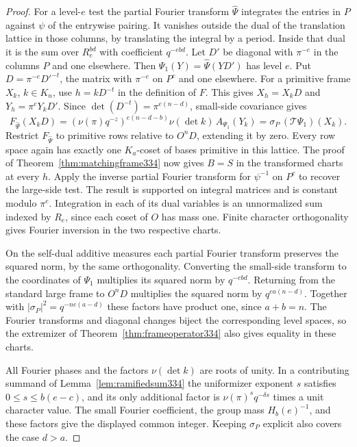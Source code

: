 \documentclass[a4paper,11pt]{article}
\theoremstyle{definition}
\theoremstyle{remark}
\numberwithin{equation}{section}
\begin{document}
\begin{proof}
For a level-\(e\) test the partial Fourier transform \(\widehat\Psi\)
integrates the entries in \(P\) against \(\psi\) of the entrywise
pairing. It vanishes outside the dual of the translation lattice in
those columns, by translating the integral by a period. Inside that
dual it is the sum over \(R_e^{bd}\) with coefficient \(q^{-ebd}\).
Let \(D'\) be diagonal with \(\pi^{-e}\) in the columns \(P\) and one
elsewhere. Then \(\Psi_1(Y)=\widehat\Psi(YD')\) has level \(e\).
Put \(D=\pi^{-e}D'^{-t}\), the matrix with \(\pi^{-e}\) on \(P^c\)
and one elsewhere. For a primitive frame \(X_k\), \(k\in K_n\), use
\(h=kD^{-t}\) in the definition of \(F\). This gives \(X_h=X_k D\)
and \(Y_h=\pi^e Y_kD'\). Since
\(\det(D^{-t})=\pi^{e(n-d)}\), small-side covariance gives
\[
 F_{\widehat\Psi}(X_k D)
   =(\nu(\pi)q^{-z})^{e(n-d-b)}
       \nu(\det k)\,A_{\Psi_1}(Y_k)
   =\sigma_P\,(\mathcal T\Psi_1)(X_k).
\]
Restrict \(F_{\widehat\Psi}\) to primitive rows relative to \(O^nD\),
extending it by zero. Every row space again has exactly one \(K_a\)-coset
of bases primitive in this lattice. The proof of
Theorem~\ref{thm:matchingframe334} now gives \(B=S\) in the transformed
charts at every \(h\). Apply the inverse partial Fourier transform for
\(\psi^{-1}\) on \(P^c\) to recover the large-side test. The result is
supported on integral matrices and is constant modulo \(\pi^e\).
Integration in each of its dual variables is an unnormalized sum indexed
by \(R_e\), since each coset of \(O\) has mass one. Finite character
orthogonality gives Fourier inversion in the two respective charts.

On the self-dual additive measures each partial Fourier transform
preserves the squared norm, by the same orthogonality. Converting the
small-side transform to the coordinates of \(\Psi_1\) multiplies its
squared norm by \(q^{-ebd}\). Returning from the standard large frame
to \(O^nD\) multiplies the squared norm by \(q^{ea(n-d)}\). Together
with \(|\sigma_P|^2=q^{-ne(a-d)}\) these factors have product one,
since \(a+b=n\). The Fourier transforms and diagonal changes biject
the corresponding level spaces, so the extremizer of
Theorem~\ref{thm:frameoperator334} also gives equality in these charts.

All Fourier phases and the factors \(\nu(\det k)\) are roots of unity.
In a contributing summand of Lemma~\ref{lem:ramifiedsum334} the
uniformizer exponent \(s\) satisfies \(0\le s\le b(e-c)\), and its only
additional factor is \(\nu(\pi)^s q^{-\delta s}\) times a unit character
value. The small Fourier coefficient, the group mass \(H_b(e)^{-1}\),
and these factors give the displayed common integer. Keeping
\(\sigma_P\) explicit also covers the case \(d>a\).
\end{proof}
\end{document}
